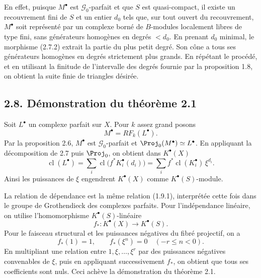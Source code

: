 \documentclass[11pt]{article}
\newcommand{\cl}{\operatorname{cl}}
\providecommand{\GL}{\operatorname{GL}}
\begin{document}
En effet, puisque \(M^\bullet\) est \(\mathcal G_0\)-parfait et que \(S\) est quasi-compact, il existe un recouvrement fini de \(S\) et un entier \(d_0\) tels que, sur tout ouvert du recouvrement, \(M^\bullet\) soit représenté par un complexe borné de \(B\)-modules localement libres de type fini, sans générateurs homogènes en degrés \(<d_0\). En prenant \(d_0\) minimal, le morphisme (2.7.2) extrait la partie du plus petit degré. Son cône a tous ses générateurs homogènes en degrés strictement plus grands. En répétant le procédé, et en utilisant la finitude de l'intervalle des degrés fournie par la proposition 1.8, on obtient la suite finie de triangles désirée.

\subsection*{2.8. Démonstration du théorème 2.1}
Soit \(L^\bullet\) un complexe parfait sur \(X\). Pour \(k\) assez grand posons
\[
  M^\bullet=RF_k(L^\bullet).
\]
Par la proposition 2.6, \(M^\bullet\) est \(\mathcal G_0\)-parfait et \(\Proj_0(M^\bullet)\simeq L^\bullet\). En appliquant la décomposition de 2.7 puis \(\Proj_0\), on obtient dans \(K^\bullet(X)\)
\[
  \cl(L^\bullet)
  =
  \sum_i\cl\bigl(f^*K_i^\bullet(d_i)\bigr)
  =
  \sum_i f^*\cl(K_i^\bullet)\,\xi^{d_i}.
\]
Ainsi les puissances de \(\xi\) engendrent \(K^\bullet(X)\) comme \(K^\bullet(S)\)-module.

La relation de dépendance est la même relation (1.9.1), interprétée cette fois dans le groupe de Grothendieck des complexes parfaits. Pour l'indépendance linéaire, on utilise l'homomorphisme \(K^\bullet(S)\)-linéaire
\[
  f_*:K^\bullet(X)\longrightarrow K^\bullet(S).
\]
Pour le faisceau structural et les puissances négatives du fibré projectif, on a
\[
  f_*(1)=1,\qquad f_*(\xi^n)=0\quad(-r\leq n<0).
\]
En multipliant une relation entre \(1,\xi,\ldots,\xi^r\) par des puissances négatives convenables de \(\xi\), puis en appliquant successivement \(f_*\), on obtient que tous ses coefficients sont nuls. Ceci achève la démonstration du théorème 2.1.



\providecommand{\Sym}{\operatorname{Sym}}
\providecommand{\GL}{\operatorname{GL}}
\providecommand{\Grass}{\operatorname{Grass}}
\providecommand{\gr}{\operatorname{gr}}
\providecommand{\ctop}{c_{\mathrm{top}}}
\providecommand{\Rep}{\operatorname{Rep}}
\providecommand{\RZ}{R_{\mathbb Z}}
\providecommand{\Dflag}{D}
\providecommand{\Gmn}{G}
\end{document}
